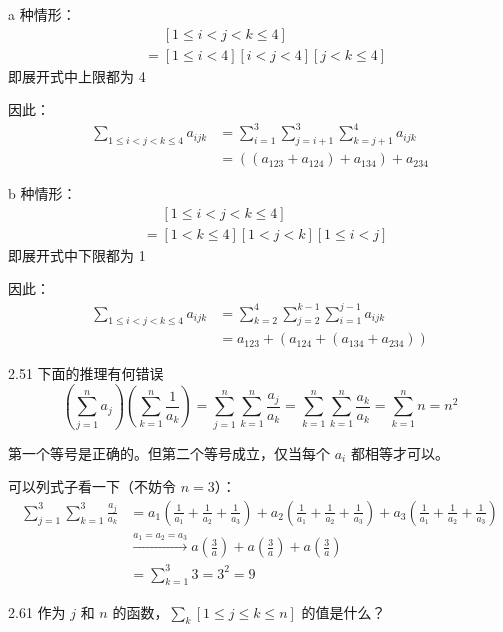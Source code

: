 a 种情形：
\begin{align*}
  &\phantom{=} [1 \leq i < j < k \leq 4] \\
  &= [1 \leq i < 4] [i < j < 4] [j < k \leq 4]
\end{align*}
即展开式中上限都为 4

因此：
\begin{align*}
  \sum_{1 \leq i < j < k \leq 4} a_{ijk} &= \sum_{i=1}^3 \sum_{j=i+1}^3 \sum_{k=j+1}^4 a_{ijk} \\
  &= ((a_{123} + a_{124}) + a_{134}) + a_{234}
\end{align*}

b 种情形：
\begin{align*}
  &\phantom{=} [1 \leq i < j < k \leq 4] \\
  &= [1 < k \leq 4] [1 < j < k] [1 \leq i < j]
\end{align*}
即展开式中下限都为 1

因此：
\begin{align*}
  \sum_{1 \leq i < j < k \leq 4} a_{ijk} &= \sum_{k=2}^4 \sum_{j=2}^{k-1} \sum_{i=1}^{j-1} a_{ijk} \\
  &= a_{123} + (a_{124} + (a_{134} + a_{234}))
\end{align*}

\begin{problem}{2.5}{1}
  下面的推理有何错误
  \[
    (\sum_{j=1}^n a_j)(\sum_{k=1}^n \frac{1}{a_k}) = \sum_{j=1}^n \sum_{k=1}^n \frac{a_j}{a_k} = \sum_{k=1}^n \sum_{k=1}^n \frac{a_k}{a_k} = \sum_{k=1}^n n = n^2
  \]
\end{problem}

第一个等号是正确的。但第二个等号成立，仅当每个 \( a_i \) 都相等才可以。

可以列式子看一下（不妨令 \( n=3 \)）：
\begin{align*}
  \sum_{j=1}^3 \sum_{k=1}^3 \frac{a_j}{a_k} &= a_1 (\frac{1}{a_1} + \frac{1}{a_2} + \frac{1}{a_3}) + a_2(\frac{1}{a_1} + \frac{1}{a_2} + \frac{1}{a_3}) + a_3(\frac{1}{a_1} + \frac{1}{a_2} + \frac{1}{a_3}) \\
  &\xrightarrow{a_1 = a_2 = a_3} a(\frac{3}{a}) + a(\frac{3}{a}) + a(\frac{3}{a}) \\
  &= \sum_{k=1}^3 3 = 3^2 = 9
\end{align*}

\begin{problem}{2.6}{1}
  作为 \( j \) 和 \( n \) 的函数，\( \sum\nolimits_{k} [1 \le j \le k \le n] \) 的值是什么？
\end{problem}


